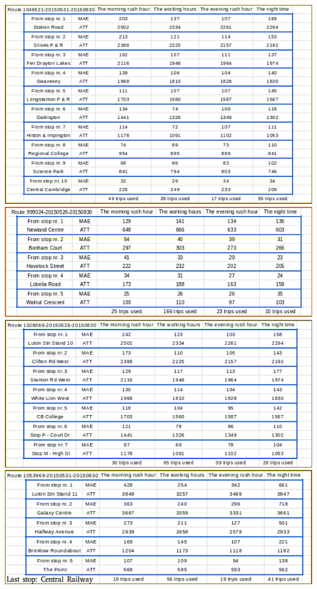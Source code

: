 \documentclass[12pt,a4paper,oneside,openright]{report}
\begin{document}
\includegraphics[width=\textwidth]{figs/table_of_1046521.png}
\includegraphics[width=\textwidth]{figs/table_of_999024.png}
\includegraphics[width=\textwidth]{figs/table_of_1028069.png}
\includegraphics[width=\textwidth]{figs/table_of_1053969.png}
\end{document}
